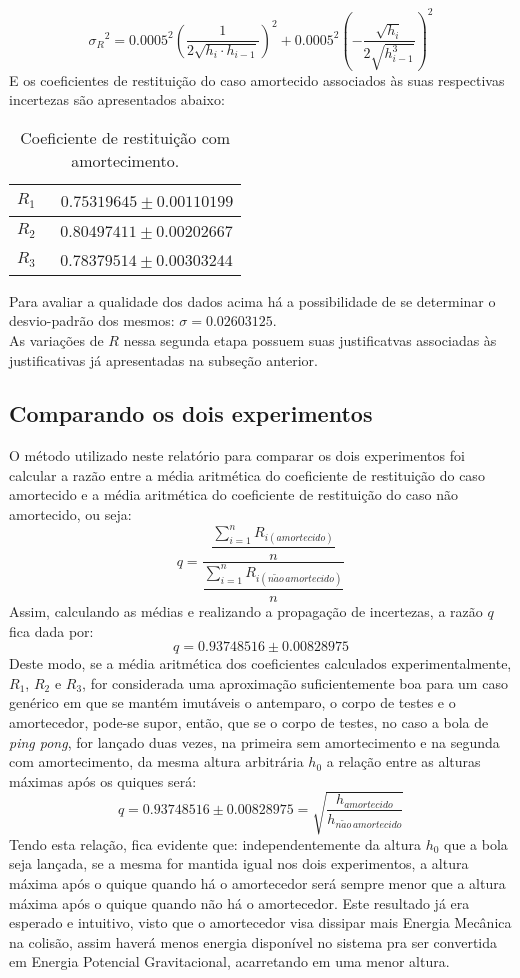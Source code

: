 \documentclass[a4paper, 12pt]{article}
\begin{document}
		 $${\sigma_R}^2 = {0.0005}^2{\left( \dfrac{1}{2\sqrt{h_i \cdot h_{i-1}}} \right) }^2+{0.0005}^2{\left( -\dfrac{\sqrt{h_i}}{2\sqrt{h_{i-1}^3}} \right) }^2$$
		E os coeficientes de restituição do caso amortecido associados às suas respectivas incertezas são apresentados abaixo:	
		\begin{table}[H]
			\centering
			\begin{tabular}{c|c}
				\hline $R_1$ & \ $0.75319645 \pm 0.00110199$\\
				\hline $R_2$ & \ $0.80497411 \pm 0.00202667$\\
				\hline $R_3$ & \ $0.78379514 \pm 0.00303244$\\
				\hline
			\end{tabular}	
			\caption{Coeficiente de restituição com amortecimento.}
			\label{tcm}		
		\end{table} 
		\noindent Para avaliar a qualidade dos dados acima há a possibilidade de se determinar o desvio-padrão dos mesmos: $\sigma = 0.02603125$. \\
		As variações de $R$ nessa segunda etapa possuem suas justificatvas associadas às justificativas já apresentadas na subseção anterior.
		\subsection{Comparando os dois experimentos}
		O método utilizado neste relatório para comparar os dois experimentos foi calcular a razão entre a média aritmética do coeficiente de restituição do caso amortecido e a média aritmética do coeficiente de restituição do caso não amortecido, ou seja:
		$$q = \dfrac{\dfrac{\sum\limits_{i=1}^n R_{i(amortecido)}}{n}}{\dfrac{\sum\limits_{i=1}^n R_{i(n\tilde{a}o \, amortecido)}}{n}}$$
		Assim, calculando as médias e realizando a propagação de incertezas, a razão $q$ fica dada por:
		$$ q = 0.93748516 \pm 0.00828975 $$
		Deste modo, se a média aritmética dos coeficientes calculados experimentalmente, $R_1$, $R_2$ e $R_3$, for considerada uma aproximação suficientemente boa para um caso genérico em que se mantém imutáveis o antemparo, o corpo de testes e o amortecedor, pode-se supor, então, que se o corpo de testes, no caso a bola de \textsl{ping pong}, for lançado duas vezes, na primeira sem amortecimento e na segunda com amortecimento, da mesma altura arbitrária $h_0$ a relação entre as alturas máximas após os quiques será:
		$$ q = 0.93748516 \pm 0.00828975 = \sqrt{\dfrac{h_{amortecido}}{h_{n\tilde{a}o \, amortecido}}}$$
		Tendo esta relação, fica evidente que: independentemente da altura $h_0$ que a bola seja lançada, se a mesma for mantida igual nos dois experimentos, a altura máxima após o quique quando há o amortecedor será sempre menor que a altura máxima após o quique quando não há o amortecedor. Este resultado já era esperado e intuitivo, visto que o amortecedor visa dissipar mais Energia Mecânica na colisão, assim haverá menos energia disponível no sistema pra ser convertida em Energia Potencial Gravitacional, acarretando em uma menor altura.
		
\end{document}
